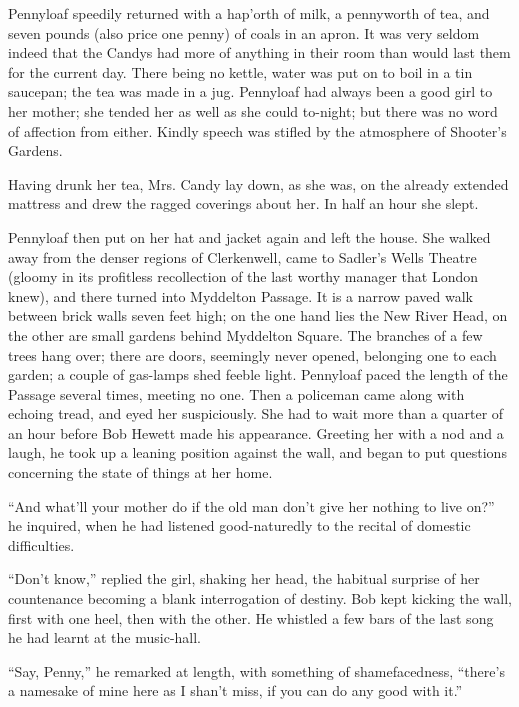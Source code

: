 Pennyloaf speedily returned with a hap'orth of milk, a pennyworth of
tea, and seven pounds (also price one penny) of coals in an apron. It
was very seldom indeed that the Candys had more of anything in their
room than would last them for the current day. There being no kettle,
water was put on to boil in a tin saucepan; the tea was made in a jug.
Pennyloaf had always been a good girl to her mother; she tended her as
well as she could to-night; but there was no word of affection from
either. Kindly speech was stifled by the atmosphere of Shooter's
Gardens.

Having drunk her tea, Mrs. Candy lay down, as she was, on the already
extended mattress and drew the ragged coverings about her. In half an
hour she slept.

{\protect\hypertarget{185}{}{}}Pennyloaf then put on her hat and jacket
again and left the house. She walked away from the denser regions of
Clerkenwell, came to Sadler's Wells Theatre (gloomy in its profitless
recollection of the last worthy manager that London knew), and there
turned into Myddelton Passage. It is a narrow paved walk between brick
walls seven feet high; on the one hand lies the New River Head, on the
other are small gardens behind Myddelton Square. The branches of a few
trees hang over; there are doors, seemingly never opened, belonging one
to each garden; a couple of gas-lamps shed feeble light. Pennyloaf paced
the length of the Passage several times, meeting no one. Then a
policeman came along with echoing tread, and eyed her suspiciously. She
had to wait more than a quarter of an hour before Bob Hewett made his
appearance. Greeting her with a nod and a laugh, he took up a leaning
position against the wall, and began to put questions concerning the
state of things at her home.

{\protect\hypertarget{186}{}{}}``And what'll your mother do if the old
man don't give her nothing to live on?'' he inquired, when he had
listened good-naturedly to the recital of domestic difficulties.

``Don't know,'' replied the girl, shaking her head, the habitual
surprise of her countenance becoming a blank interrogation of destiny.
Bob kept kicking the wall, first with one heel, then with the other. He
whistled a few bars of the last song he had learnt at the music-hall.

``Say, Penny,'' he remarked at length, with something of shamefacedness,
``there's a namesake of mine here as I shan't miss, if you can do any
good with it.''

